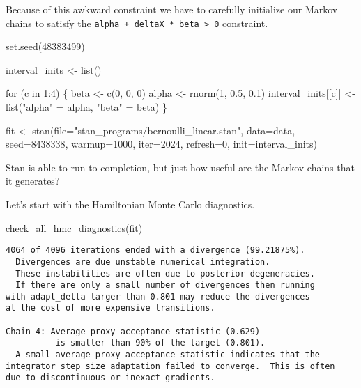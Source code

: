 \documentclass[
  letterpaper,
  DIV=11,
  numbers=noendperiod]{scrartcl}
\newenvironment{Shaded}{\begin{snugshade}}{\end{snugshade}}
\newcommand{\AttributeTok}[1]{\textcolor[rgb]{0.40,0.45,0.13}{#1}}
\newcommand{\ControlFlowTok}[1]{\textcolor[rgb]{0.00,0.23,0.31}{#1}}
\newcommand{\DecValTok}[1]{\textcolor[rgb]{0.68,0.00,0.00}{#1}}
\newcommand{\FloatTok}[1]{\textcolor[rgb]{0.68,0.00,0.00}{#1}}
\newcommand{\FunctionTok}[1]{\textcolor[rgb]{0.28,0.35,0.67}{#1}}
\newcommand{\NormalTok}[1]{\textcolor[rgb]{0.00,0.23,0.31}{#1}}
\newcommand{\OtherTok}[1]{\textcolor[rgb]{0.00,0.23,0.31}{#1}}
\newcommand{\SpecialCharTok}[1]{\textcolor[rgb]{0.37,0.37,0.37}{#1}}
\newcommand{\StringTok}[1]{\textcolor[rgb]{0.13,0.47,0.30}{#1}}
\begin{document}
Because of this awkward constraint we have to carefully initialize our
Markov chains to satisfy the
\texttt{alpha\ +\ deltaX\ *\ beta\ \textgreater{}\ 0} constraint.

\begin{Shaded}
\begin{Highlighting}[]
\FunctionTok{set.seed}\NormalTok{(}\DecValTok{48383499}\NormalTok{)}

\NormalTok{interval\_inits }\OtherTok{\textless{}{-}} \FunctionTok{list}\NormalTok{()}

\ControlFlowTok{for}\NormalTok{ (c }\ControlFlowTok{in} \DecValTok{1}\SpecialCharTok{:}\DecValTok{4}\NormalTok{) \{}
\NormalTok{  beta }\OtherTok{\textless{}{-}} \FunctionTok{c}\NormalTok{(}\DecValTok{0}\NormalTok{, }\DecValTok{0}\NormalTok{, }\DecValTok{0}\NormalTok{)}
\NormalTok{  alpha }\OtherTok{\textless{}{-}} \FunctionTok{rnorm}\NormalTok{(}\DecValTok{1}\NormalTok{, }\FloatTok{0.5}\NormalTok{, }\FloatTok{0.1}\NormalTok{)}
\NormalTok{  interval\_inits[[c]] }\OtherTok{\textless{}{-}} \FunctionTok{list}\NormalTok{(}\StringTok{"alpha"} \OtherTok{=}\NormalTok{ alpha, }\StringTok{"beta"} \OtherTok{=}\NormalTok{ beta)}
\NormalTok{\}}

\NormalTok{fit }\OtherTok{\textless{}{-}} \FunctionTok{stan}\NormalTok{(}\AttributeTok{file=}\StringTok{"stan\_programs/bernoulli\_linear.stan"}\NormalTok{,}
            \AttributeTok{data=}\NormalTok{data, }\AttributeTok{seed=}\DecValTok{8438338}\NormalTok{,}
            \AttributeTok{warmup=}\DecValTok{1000}\NormalTok{, }\AttributeTok{iter=}\DecValTok{2024}\NormalTok{, }\AttributeTok{refresh=}\DecValTok{0}\NormalTok{,}
            \AttributeTok{init=}\NormalTok{interval\_inits)}
\end{Highlighting}
\end{Shaded}

Stan is able to run to completion, but just how useful are the Markov
chains that it generates?

Let's start with the Hamiltonian Monte Carlo diagnostics.

\begin{Shaded}
\begin{Highlighting}[]
\FunctionTok{check\_all\_hmc\_diagnostics}\NormalTok{(fit)}
\end{Highlighting}
\end{Shaded}

\begin{verbatim}
4064 of 4096 iterations ended with a divergence (99.21875%).
  Divergences are due unstable numerical integration.
  These instabilities are often due to posterior degeneracies.
  If there are only a small number of divergences then running
with adapt_delta larger than 0.801 may reduce the divergences
at the cost of more expensive transitions.

Chain 4: Average proxy acceptance statistic (0.629)
          is smaller than 90% of the target (0.801).
  A small average proxy acceptance statistic indicates that the
integrator step size adaptation failed to converge.  This is often
due to discontinuous or inexact gradients.
\end{verbatim}
\end{document}
